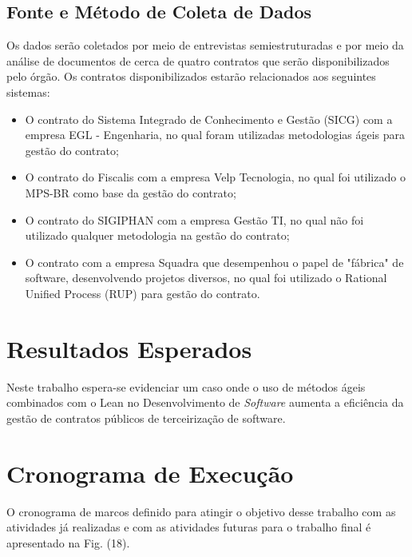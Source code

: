 \subsection[Fonte e Método Coleta de Dados]{Fonte e Método de Coleta de Dados}

Os dados serão coletados por meio de entrevistas semiestruturadas e por meio da análise de documentos de cerca de quatro contratos que serão disponibilizados pelo órgão. Os contratos disponibilizados estarão relacionados aos seguintes sistemas:
\begin{itemize}
\item  O contrato do Sistema Integrado de Conhecimento e Gestão (SICG) com a empresa EGL - Engenharia, no qual foram utilizadas metodologias ágeis para gestão do contrato;
\item  O contrato do Fiscalis com a empresa Velp Tecnologia, no qual foi utilizado o MPS-BR como base da gestão do contrato;
\item  O contrato do SIGIPHAN com a empresa Gestão TI, no qual não foi utilizado qualquer metodologia na gestão do contrato;
\item  O contrato com a empresa Squadra que desempenhou o papel de "fábrica" de software, desenvolvendo projetos diversos, no qual foi utilizado o Rational Unified Process (RUP) para gestão do contrato.
\end{itemize}

\section[Resultados Esperados]{Resultados Esperados}

Neste trabalho espera-se evidenciar um caso onde o uso de métodos ágeis combinados com o Lean no Desenvolvimento de \textit{Software} aumenta a eficiência da gestão de contratos públicos de terceirização de software.

\section[Cronograma de Execução]{Cronograma de Execução}

O cronograma de marcos definido para atingir o objetivo desse trabalho com as atividades já realizadas e com as atividades futuras para o trabalho final é apresentado na Fig. (18). 

